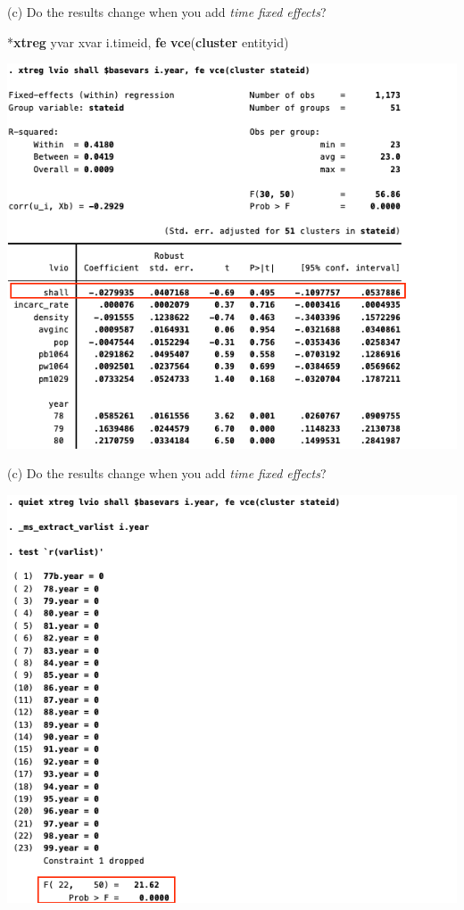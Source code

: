 \documentclass[
  10pt,
  ignorenonframetext,
]{beamer}
\newenvironment{Shaded}{\begin{snugshade}}{\end{snugshade}}
\newcommand{\KeywordTok}[1]{\textcolor[rgb]{0.13,0.29,0.53}{\textbf{#1}}}
\newcommand{\NormalTok}[1]{#1}
\begin{document}
\begin{frame}[fragile]{(c) Do the results change when you add \emph{time
fixed effects}?}
\protect\hypertarget{c-do-the-results-change-when-you-add-time-fixed-effects}{}
\footnotesize

\begin{Shaded}
\begin{Highlighting}[]
\NormalTok{*}\KeywordTok{xtreg}\NormalTok{ yvar xvar i.timeid, }\KeywordTok{fe} \KeywordTok{vce}\NormalTok{(}\KeywordTok{cluster}\NormalTok{ entityid)}
\end{Highlighting}
\end{Shaded}

\begin{flushleft}\includegraphics[width=0.8\linewidth]{pictures/Ex1-TwowayFEs-5} \end{flushleft}
\end{frame}

\begin{frame}{(c) Do the results change when you add \emph{time fixed
effects}?}
\protect\hypertarget{c-do-the-results-change-when-you-add-time-fixed-effects-1}{}
\begin{flushleft}\includegraphics[width=0.7\linewidth]{pictures/Ex1-TestTimeFEs-2} \end{flushleft}
\end{frame}
\end{document}
